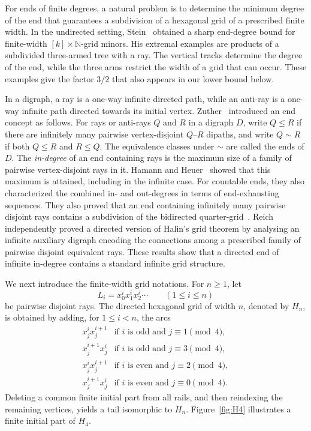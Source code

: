 \documentclass[11pt]{article}
\theoremstyle{remark}
\numberwithin{equation}{section}
\begin{document}
For ends of finite degrees, a natural problem is to determine the minimum degree of the end that guarantees a subdivision of a hexagonal grid of a prescribed finite width. In the undirected setting, Stein~\cite{Stein} obtained a sharp end-degree bound for finite-width $[k]\times\mathbb{N}$-grid minors. His extremal examples are products of a subdivided three-armed tree with a ray. The vertical tracks determine the degree of the end, while the three arms restrict the width of a grid that can occur. These examples give the factor $3/2$ that also appears in our lower bound below.

In a digraph, a ray is a one-way infinite directed path, while an anti-ray is a one-way infinite path directed towards its initial vertex. Zuther~\cite{ZutherThesis,ZutherEnds} introduced an end concept as follows. For rays or anti-rays $Q$ and $R$ in a digraph $D$, write $Q\leq R$ if there are infinitely many pairwise vertex-disjoint $Q$--$R$ dipaths, and write $Q\sim R$ if both $Q\leq R$ and $R\leq Q$. The equivalence classes under $\sim$ are called the ends of $D$. The \emph{in-degree} of an end containing rays is the maximum size of a family of pairwise vertex-disjoint rays in it.  Hamann and Heuer~\cite{HamannHeuerEndDegree} showed that this maximum is attained, including in the infinite case. For countable ends, they also characterized the combined in- and out-degrees in terms of end-exhausting sequences. They also proved that an end containing infinitely many pairwise disjoint rays contains a subdivision of the bidirected quarter-grid~\cite{HamannHeuerGrids}. Reich~\cite{Reich} independently proved a directed version of Halin's grid theorem by analysing an infinite auxiliary digraph encoding the connections among a prescribed family of pairwise disjoint equivalent rays. These results show that a directed end of infinite in-degree contains a standard infinite grid structure.

We next introduce the finite-width grid notations. For $n\ge1$, let
\[
L_i=x^i_0x^i_1x^i_2\cdots\qquad(1\le i\le n)
\]
be pairwise disjoint rays. The directed hexagonal grid of width $n$, denoted by $H_n$, is obtained by adding, for $1\le i<n$, the arcs
\[
\begin{array}{ll}
x^i_jx^{i+1}_j & \text{if $i$ is odd and $j\equiv1\pmod4$},\\
x^{i+1}_jx^i_j & \text{if $i$ is odd and $j\equiv3\pmod4$},\\
x^i_jx^{i+1}_j & \text{if $i$ is even and $j\equiv2\pmod4$},\\
x^{i+1}_jx^i_j & \text{if $i$ is even and $j\equiv0\pmod4$}.
\end{array}
\]
Deleting a common finite initial part from all rails, and then reindexing the remaining vertices, yields a tail isomorphic to $H_n$. Figure~\ref{fig:H4} illustrates a finite initial part of $H_4$. 
 
\end{document}
